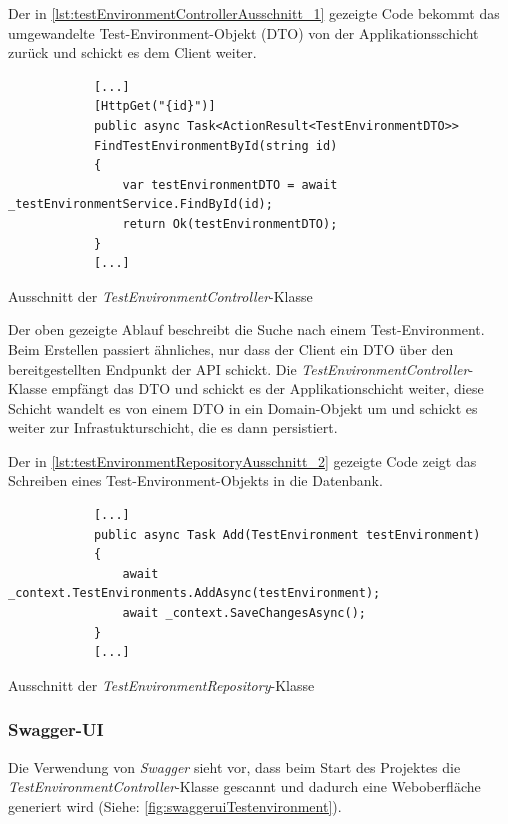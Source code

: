 \documentclass[a4paper, fontsize=11pt, parskip=half, twoside, headings=openright]{scrreprt}
\begin{document}
	Der in \autoref{lst:testEnvironmentControllerAusschnitt_1} gezeigte Code bekommt das umgewandelte Test-Environment-Objekt (\ac{DTO}) von der Applikationsschicht zurück und schickt es dem Client weiter.
	
	\begin{listing}[!htb]
		\begin{verbatim}
			[...]	
			[HttpGet("{id}")]
			public async Task<ActionResult<TestEnvironmentDTO>> 
			FindTestEnvironmentById(string id)
			{
				var testEnvironmentDTO = await _testEnvironmentService.FindById(id);
				return Ok(testEnvironmentDTO);
			}	
			[...]
		\end{verbatim}
		\caption{Ausschnitt der \emph{TestEnvironmentController}-Klasse}
		\label{lst:testEnvironmentControllerAusschnitt_1}
	\end{listing}

	Der oben gezeigte Ablauf beschreibt die Suche nach einem Test-Environment. 
	Beim Erstellen passiert ähnliches, nur dass der Client ein \ac{DTO} über den bereitgestellten Endpunkt der \ac{API} schickt.
	Die \emph{TestEnvironmentController}-Klasse empfängt das \ac{DTO} und schickt es der Applikationschicht weiter, diese Schicht wandelt es von einem \ac{DTO} in ein Domain-Objekt um und schickt es weiter zur Infrastukturschicht, die es dann persistiert.
	
	Der in \autoref{lst:testEnvironmentRepositoryAusschnitt_2} gezeigte Code zeigt das Schreiben eines Test-Environment-Objekts in die Datenbank.
	
	\begin{listing}[!htb]
		\begin{verbatim}
			[...]	
			public async Task Add(TestEnvironment testEnvironment)
			{
				await _context.TestEnvironments.AddAsync(testEnvironment);
				await _context.SaveChangesAsync();
			}
			[...]
		\end{verbatim}
		\caption{Ausschnitt der \emph{TestEnvironmentRepository}-Klasse}
		\label{lst:testEnvironmentRepositoryAusschnitt_2}
	\end{listing}
	
	\subsubsection{Swagger-UI}
	Die Verwendung von \emph{Swagger} sieht vor, dass beim Start des Projektes die \emph{TestEnvironmentController}-Klasse gescannt und dadurch eine Weboberfläche generiert wird (Siehe: \autoref{fig:swaggeruiTestenvironment}).
	
\end{document}
